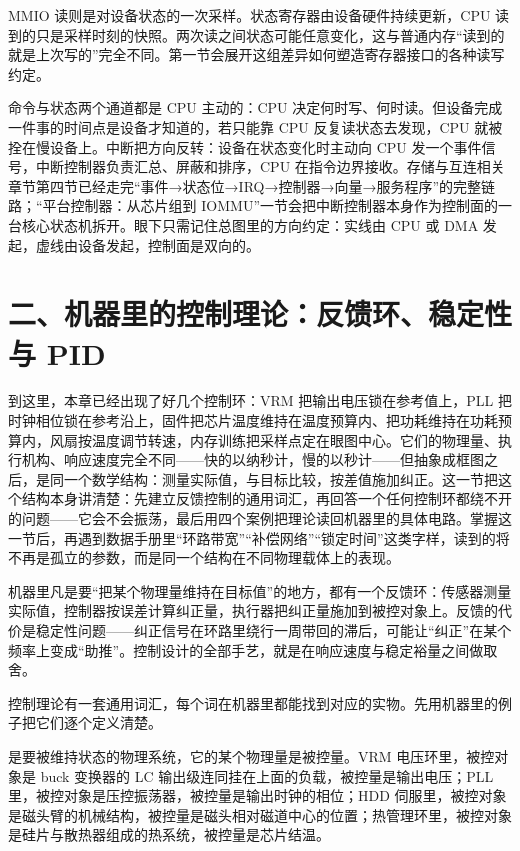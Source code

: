 MMIO 读则是对设备状态的一次采样。状态寄存器由设备硬件持续更新，CPU 读到的只是采样时刻的快照。两次读之间状态可能任意变化，这与普通内存“读到的就是上次写的”完全不同。第一节会展开这组差异如何塑造寄存器接口的各种读写约定。


命令与状态两个通道都是 CPU 主动的：CPU 决定何时写、何时读。但设备完成一件事的时间点是设备才知道的，若只能靠 CPU 反复读状态去发现，CPU 就被拴在慢设备上。中断把方向反转：设备在状态变化时主动向 CPU 发一个事件信号，中断控制器负责汇总、屏蔽和排序，CPU 在指令边界接收。存储与互连相关章节第四节已经走完“事件→状态位→IRQ→控制器→向量→服务程序”的完整链路；“平台控制器：从芯片组到 IOMMU”一节会把中断控制器本身作为控制面的一台核心状态机拆开。眼下只需记住总图里的方向约定：实线由 CPU 或 DMA 发起，虚线由设备发起，控制面是双向的。

\section{二、机器里的控制理论：反馈环、稳定性与 PID}

到这里，本章已经出现了好几个控制环：VRM 把输出电压锁在参考值上，PLL 把时钟相位锁在参考沿上，固件把芯片温度维持在温度预算内、把功耗维持在功耗预算内，风扇按温度调节转速，内存训练把采样点定在眼图中心。它们的物理量、执行机构、响应速度完全不同——快的以纳秒计，慢的以秒计——但抽象成框图之后，是同一个数学结构：测量实际值，与目标比较，按差值施加纠正。这一节把这个结构本身讲清楚：先建立反馈控制的通用词汇，再回答一个任何控制环都绕不开的问题——它会不会振荡，最后用四个案例把理论读回机器里的具体电路。掌握这一节后，再遇到数据手册里“环路带宽”“补偿网络”“锁定时间”这类字样，读到的将不再是孤立的参数，而是同一个结构在不同物理载体上的表现。

\begin{keyidea}
机器里凡是要“把某个物理量维持在目标值”的地方，都有一个反馈环：传感器测量实际值，控制器按误差计算纠正量，执行器把纠正量施加到被控对象上。反馈的代价是稳定性问题——纠正信号在环路里绕行一周带回的滞后，可能让“纠正”在某个频率上变成“助推”。控制设计的全部手艺，就是在响应速度与稳定裕量之间做取舍。
\end{keyidea}


控制理论有一套通用词汇，每个词在机器里都能找到对应的实物。先用机器里的例子把它们逐个定义清楚。

是要被维持状态的物理系统，它的某个物理量是被控量。VRM 电压环里，被控对象是 buck 变换器的 LC 输出级连同挂在上面的负载，被控量是输出电压；PLL 里，被控对象是压控振荡器，被控量是输出时钟的相位；HDD 伺服里，被控对象是磁头臂的机械结构，被控量是磁头相对磁道中心的位置；热管理环里，被控对象是硅片与散热器组成的热系统，被控量是芯片结温。


